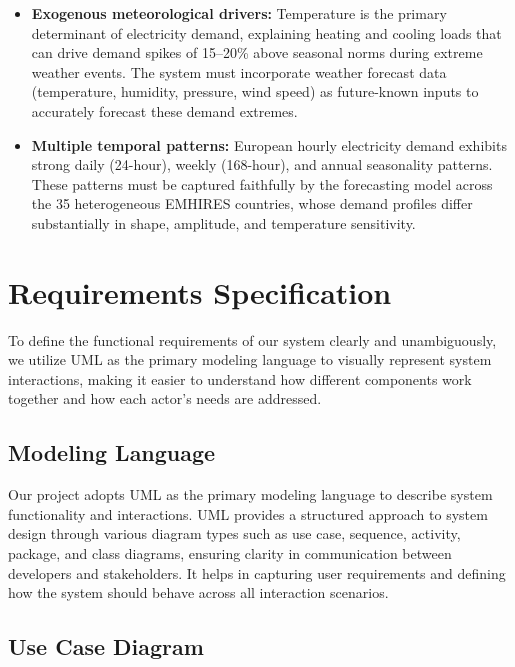 \begin{itemize}
  \item \textbf{Exogenous meteorological drivers:} Temperature is the
        primary determinant of electricity demand, explaining heating and
        cooling loads that can drive demand spikes of 15--20\% above
        seasonal norms during extreme weather events. The system must
        incorporate weather forecast data (temperature, humidity, pressure,
        wind speed) as future-known inputs to accurately forecast these
        demand extremes.

  \item \textbf{Multiple temporal patterns:} European hourly electricity
        demand exhibits strong daily (24-hour), weekly (168-hour), and
        annual seasonality patterns. These patterns must be captured
        faithfully by the forecasting model across the 35 heterogeneous
        EMHIRES countries, whose demand profiles differ substantially in
        shape, amplitude, and temperature sensitivity.

\end{itemize}

\section{Requirements Specification}
\label{sec:req_spec}

To define the functional requirements of our system clearly and unambiguously,
we utilize UML as the primary modeling language to visually represent system
interactions, making it easier to understand how different components work
together and how each actor's needs are addressed.

\subsection{Modeling Language}
\label{subsec:modeling_lang}

Our project adopts UML as the primary modeling language to describe system
functionality and interactions. UML provides a structured approach to system
design through various diagram types such as use case, sequence, activity, package, and class diagrams, ensuring clarity in communication between developers and stakeholders. It helps in capturing user requirements and defining how the system should behave across all interaction scenarios.

\subsection{Use Case Diagram}
\label{subsec:usecase}

